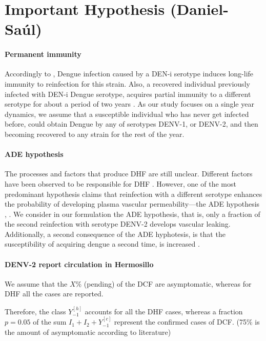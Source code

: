 \section*{Important Hypothesis (Daniel-Saúl)}
    \paragraph{Permanent immunity}
    Accordingly to \cite{WHO}, Dengue infection caused by a DEN-i serotype induces long-life immunity to reinfection for this strain. Also,  a recovered individual previously infected with DEN-i Dengue serotype, acquires partial immunity to a different serotype for about a period of two years \cite{Reich2013}. As our study focuses on a single year dynamics, we assume that a susceptible individual who has never get infected before, could obtain Dengue by any of serotypes DENV-1, or DENV-2, and then becoming recovered to any strain for the rest of the year. 
    
    \paragraph{ADE hypothesis}
    The processes and factors that produce \ac{DHF} are still unclear. Different factors have
    been observed to be responsible for DHF \cite{Martina2009}. However, one of the most predominant hypothesis claims that reinfection with a different serotype enhances the probability of developing plasma vascular permeability---the \ac{ADE} hypothesis \citep[see, e.g.][p. 295]{Halstead1992}, \cite{Guzman2013}. We consider in our formulation the ADE hypothesis, that 
    is, only a fraction of the second reinfection with serotype \ac{DENV-2} develops vascular leaking. Additionally, a second consequence of the ADE hyphotesis, is that the susceptibility of acquiring dengue a second time, is increased \cite{Recker2009}. \\
%
    \paragraph{\ac{DENV-2} report circulation in Hermosillo}



    We assume that the $X\%$ (pending) of the \ac{DCF} are asymptomatic, whereas for 
    \ac{DHF}  all the cases are reported. 
    
    
    Therefore, the class $Y_{-1}^{[h]}$ accounts for
    all the \ac{DHF} cases, whereas a fraction $p=0.05$ of the sum 
    $I_1+ I_2 + Y_{-1}^{[c]}$ represent the confirmed cases of \ac{DCF}. (75\% is the amount of asymptomatic according to literature)

